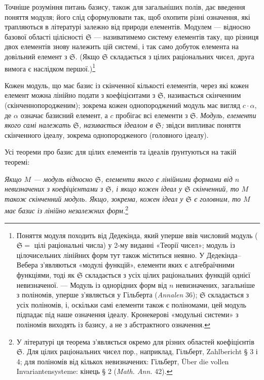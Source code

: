 \documentclass[11pt]{article}
\providecommand{\frS}{\mathfrak S}
\begin{document}
Точніше розуміння питань базису, також для загальніших полів, дає введення поняття модуля; його слід сформулювати так, щоб охопити різні означення, які трапляються в літературі залежно від природи елементів. Модулем --- відносно базової області цілісності \(\frS\) --- називатимемо систему елементів таку, що різниця двох елементів знову належить цій системі, і так само добуток елемента на довільний елемент з \(\frS\). (Якщо \(\frS\) складається з цілих раціональних чисел, друга вимога є наслідком першої.)\footnote{Поняття модуля походить від Дедекінда, який уперше ввів числовий модуль (\(\frS=\) цілі раціональні числа) у 2-му виданні «Теорії чисел»; модуль із цілочисельних лінійних форм тут також міститься неявно. У Дедекінда--Вебера з'являються «модулі функцій», елементи яких є алгебраїчними функціями, тоді як \(\frS\) складається з усіх цілих раціональних функцій однієї невизначеної. --- Модуль із однорідних форм від \(n\) невизначених, загальніше з поліномів, уперше з'являється у Гільберта (\emph{Annalen} 36); \(\frS\) складається з усіх поліномів, і, оскільки самі елементи також є поліномами, цей модуль підпадає під наше означення ідеалу. Кронекерові «модульні системи» з поліномів виходять із базису, а не з абстрактного означення.}

Кожен модуль, що має базис із скінченної кількості елементів, через які кожен елемент можна лінійно подати з коефіцієнтами з \(\frS\), називається скінченним (скінченнопородженим); зокрема кожен однопороджений модуль має вигляд \(c\cdot\alpha\), де \(\alpha\) означає базисний елемент, а \(c\) пробігає всі елементи з \(\frS\). \emph{Модуль, елементи якого самі належать \(\frS\), називається ідеалом в \(\frS\);} звідси випливає поняття скінченного ідеалу, зокрема однопородженого (головного ідеалу).

Усі теореми про базис для цілих елементів та ідеалів ґрунтуються на такій теоремі:

\emph{Якщо \(M\) --- модуль відносно \(\frS\), елементи якого є лінійними формами від \(n\) невизначених з коефіцієнтами з \(\frS\), і якщо кожен ідеал у \(\frS\) скінченний, то \(M\) також скінченний модуль. Якщо, зокрема, кожен ідеал у \(\frS\) є головним, то \(M\) має базис із лінійно незалежних форм.}\footnote{У літературі ця теорема з'являється окремо для різних областей коефіцієнтів \(\frS\). Для цілих раціональних чисел пор., наприклад, Гільберт, Zahlbericht § 3 і 4; для поліномів від кількох невизначених: Гільберт, Über die vollen Invariantensysteme: кінець § 2 (\emph{Math. Ann.} 42).}
\end{document}
